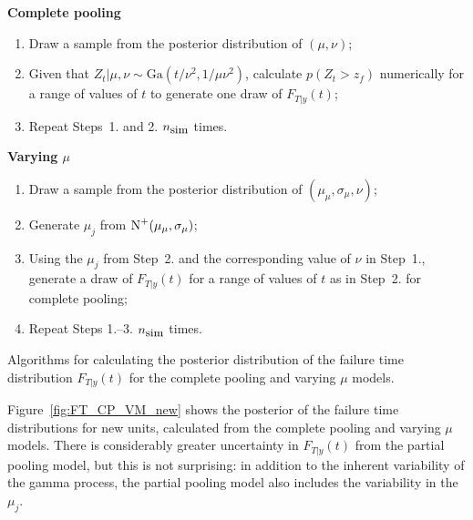 \begin{table}
\centering
\begin{multicols}{2}

\textbf{Complete pooling}
\begin{enumerate}
    \item Draw a sample from the posterior distribution of $(\mu, \nu)$;
    \item Given that $Z_t|\mu, \nu \sim \mbox{Ga}(t/\nu^2, 1/\mu \nu^2)$, calculate $p(Z_t > z_f)$ numerically for a range of values of $t$ to generate one draw of $F_{T|y}(t)$;
    \item Repeat Steps~1. and 2. $n_{\hbox{\small{sim}}}$ times.
\end{enumerate}

\columnbreak

\textbf{Varying $\mu$}
\begin{enumerate}
    \item Draw a sample from the posterior distribution of $(\mu_\mu, \sigma_\mu, \nu)$;
    \item Generate $\mu_j$ from $\hbox{N}^{+}(\mu_\mu, \sigma_\mu)$;
    \item Using the $\mu_j$ from Step~2. and the corresponding value of $\nu$ in Step~1., generate a draw of $F_{T|y}(t)$ for a range of values of $t$ as in Step~2. for complete pooling;
    \item Repeat Steps 1.--3. $n_{\hbox{\small{sim}}}$ times.
\end{enumerate}

\end{multicols}
\caption{Algorithms for calculating the posterior distribution of the failure time distribution $F_{T|y}(t)$ for the complete pooling and varying $\mu$ models.}\label{fig:FT_algs}
\end{table}

Figure~\ref{fig:FT_CP_VM_new} shows the posterior of the failure time distributions for new units, calculated from the complete pooling and varying $\mu$ models. There is considerably greater uncertainty in $F_{T|y}(t)$ from the partial pooling model, but this is not surprising: in addition to the inherent variability of the gamma process, the partial pooling model also includes the variability in the $\mu_j$. 

